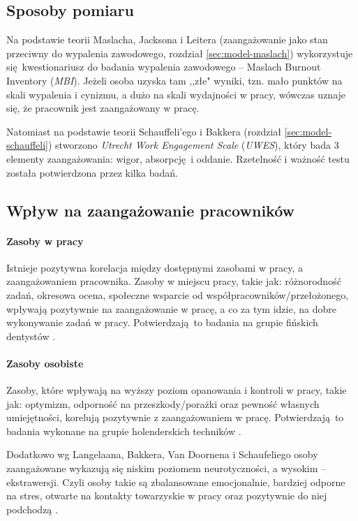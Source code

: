 \subsection{Sposoby pomiaru}
Na podstawie teorii Maslacha, Jacksona i Leitera (zaangażowanie jako stan przeciwny do wypalenia zawodowego, rozdział \ref{sec:model-maslach}) wykorzystuje się kwestionariusz do badania wypalenia zawodowego -- Maslach Burnout Inventory (\emph{MBI}). Jeżeli osoba uzyska tam ,,złe" wyniki, tzn. mało punktów na skali wypalenia i cynizmu, a dużo na skali wydajności w pracy, wówczas uznaje się, że pracownik jest zaangażowany w pracę.

Natomiast na podstawie teorii Schauffeli'ego i Bakkera (rozdział \ref{sec:model-schauffeli}) stworzono \emph{Utrecht Work Engagement Scale} (\emph{UWES}), który bada 3 elementy zaangażowania: wigor, absorpcję i oddanie. Rzetelność i ważność testu została potwierdzona przez kilka badań.

\subsection{Wpływ na zaangażowanie pracowników}
\label{sec:theory-eng-infl}
\paragraph{Zasoby w pracy}
Istnieje pozytywna korelacja między dostępnymi zasobami w pracy, a zaangażowaniem pracownika. Zasoby w miejscu pracy, takie jak: różnorodność zadań, okresowa ocena, społeczne wsparcie od współpracowników/przełożonego, wpływają pozytywnie na zaangażowanie w pracę, a co za tym idzie, na dobre wykonywanie zadań w pracy. Potwierdzają to badania na grupie fińskich dentystów \cite{hakanen2008positive}.
\paragraph{Zasoby osobiste}
Zasoby, które wpływają na wyższy poziom opanowania i kontroli w pracy, takie jak: optymizm, odporność na przeszkody/porażki oraz pewność własnych umiejętności, korelują pozytywnie z zaangażowaniem w pracę. Potwierdzają to badania wykonane na grupie holenderskich techników \cite{xanthopoulou2007role}.

Dodatkowo wg Langelaana, Bakkera, Van Doornena i Schaufeliego osoby zaangażowane wykazują się niskim poziomem neurotyczności, a wysokim -- ekstrawersji. Czyli osoby takie są zbalansowane emocjonalnie, bardziej odporne na stres, otwarte na kontakty towarzyskie w pracy oraz pozytywnie do niej podchodzą \cite{langelaan2006burnout}. 

